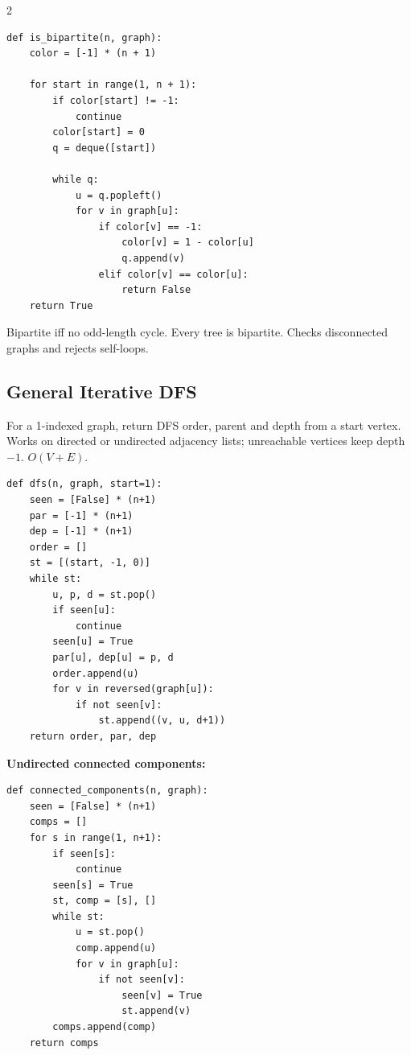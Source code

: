 \documentclass[9pt,a4paper]{extarticle}
\begin{document}
\begin{multicols}{2}
\begin{lstlisting}
def is_bipartite(n, graph):
    color = [-1] * (n + 1)

    for start in range(1, n + 1):
        if color[start] != -1:
            continue
        color[start] = 0
        q = deque([start])

        while q:
            u = q.popleft()
            for v in graph[u]:
                if color[v] == -1:
                    color[v] = 1 - color[u]
                    q.append(v)
                elif color[v] == color[u]:
                    return False
    return True
\end{lstlisting}
Bipartite iff no odd-length cycle. Every tree is bipartite. Checks disconnected graphs and rejects self-loops.

\par\noindent\begin{minipage}[t]{\linewidth}
\subsection{General Iterative DFS}
For a 1-indexed graph, return DFS order, parent and depth from a start
vertex. Works on directed or undirected adjacency lists; unreachable
vertices keep depth $-1$. $O(V+E)$.
\begin{lstlisting}
def dfs(n, graph, start=1):
    seen = [False] * (n+1)
    par = [-1] * (n+1)
    dep = [-1] * (n+1)
    order = []
    st = [(start, -1, 0)]
    while st:
        u, p, d = st.pop()
        if seen[u]:
            continue
        seen[u] = True
        par[u], dep[u] = p, d
        order.append(u)
        for v in reversed(graph[u]):
            if not seen[v]:
                st.append((v, u, d+1))
    return order, par, dep
\end{lstlisting}
\end{minipage}\par

\noindent\begin{minipage}[t]{\linewidth}
\textbf{Undirected connected components:}
\begin{lstlisting}
def connected_components(n, graph):
    seen = [False] * (n+1)
    comps = []
    for s in range(1, n+1):
        if seen[s]:
            continue
        seen[s] = True
        st, comp = [s], []
        while st:
            u = st.pop()
            comp.append(u)
            for v in graph[u]:
                if not seen[v]:
                    seen[v] = True
                    st.append(v)
        comps.append(comp)
    return comps


\end{lstlisting}
\end{minipage}
\end{multicols}
\end{document}
